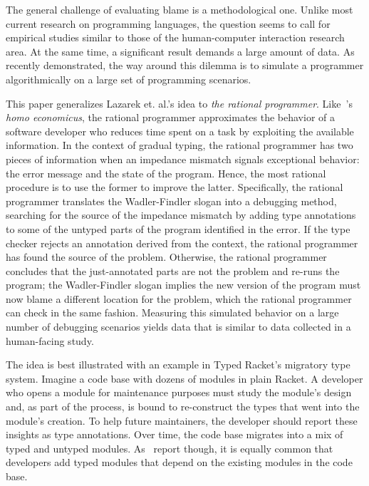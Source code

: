 
The general challenge of evaluating blame is a methodological one. Unlike most
current research on programming languages, the question seems to call for
empirical studies similar to those of the human-computer interaction research
area. At the same time, a significant result demands a large amount of
data. As~\citet{lksfd-popl-2020} recently demonstrated, the way around this
dilemma is to simulate a programmer algorithmically on a large set
of programming scenarios.



This paper generalizes Lazarek et. al.'s idea to {\em the rational programmer\/}.
Like~\citet{mill1874essays}'s {\it homo economicus\/}, the rational programmer approximates the
behavior of a software developer who reduces time spent on a task by exploiting the
available information. In the context of gradual typing, the rational programmer
has two pieces of information when an impedance mismatch signals exceptional
behavior: the error message and the state of the program. Hence, the most
rational procedure is to use the former to improve the latter. Specifically,
the rational programmer translates the Wadler-Findler slogan into a debugging
method, searching for the source of the impedance mismatch by adding type
annotations to some of the untyped parts of the program identified in the error.
If the type checker rejects an annotation derived from the context, the
rational programmer has found the source of the problem.
Otherwise, the rational programmer concludes that the just-annotated parts are not the problem
and re-runs the program;
the Wadler-Findler slogan implies the new version of the program must now blame
a different location for the problem, which the rational programmer can check in
the same fashion. 
Measuring this simulated
behavior on a large number of debugging scenarios yields data that
is similar to data collected in a human-facing study.

The idea is best illustrated with an example in Typed Racket's migratory type
system. Imagine a code base with dozens of modules in plain Racket. A developer
who opens a module for maintenance purposes must study the module's design and,
as part of the process, is bound to re-construct the types that went into the
module's creation.  To help future maintainers, the developer should report
these insights as type annotations. Over time, the code base migrates into a mix
of typed and untyped modules. As~\citet{tfffgksst-snapl-2017} report though,
it is equally common that developers add typed modules that depend on
the existing modules in the code base.


